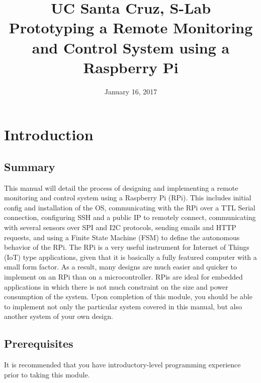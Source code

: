 \documentclass{article}
\title{
  UC Santa Cruz, S-Lab \\
  \textbf{Prototyping a Remote Monitoring and Control System using a Raspberry Pi} \\
}
\date{January 16, 2017}
\begin{document}
\maketitle

\tableofcontents

\section{Introduction}
  \subsection{Summary}
  This manual will detail the process of designing and implementing a remote monitoring and control system using a Raspberry Pi (RPi). This includes initial config and installation of the OS, communicating with the RPi over a TTL Serial connection, configuring SSH and a public IP to remotely connect, communicating with several sensors over SPI and I2C protocols, sending emails and HTTP requests, and using a Finite State Machine (FSM) to define the autonomous behavior of the RPi.
  The RPi is a very useful instrument for Internet of Things (IoT) type applications, given that it is basically a fully featured computer with a small form factor. As a result, many designs are much easier and quicker to implement on an RPi than on a microcontroller. RPis are ideal for embedded applications in which there is not much constraint on the size and power consumption of the system. Upon completion of this module, you should be able to implement not only the particular system covered in this manual, but also another system of your own design.
  \subsection{Prerequisites}
  It is recommended that you have introductory-level programming experience prior to taking this module.
\end{document}
